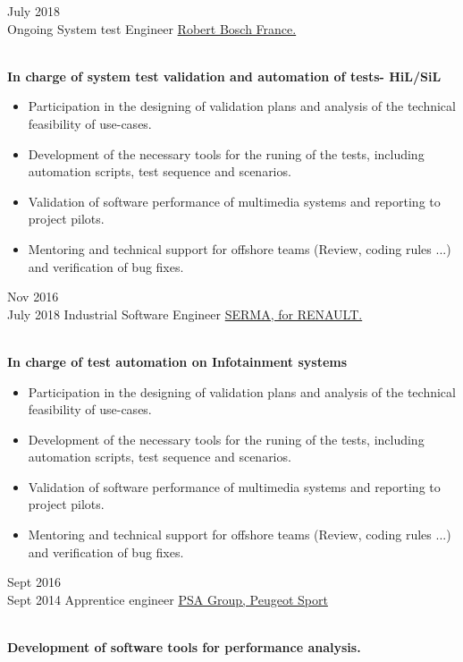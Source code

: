 \documentclass[letterpaper]{twentysecondcv} %
\begin{document}
\begin{twenty} %
	\twentyitem
    	{July 2018 \\Ongoing}
        {System test Engineer}
        {\href{http://www.serma-ingenierie.com/}{Robert Bosch France.}}
        {}
        {
        {\\ \textbf{In charge of system test validation and automation of tests- HiL/SiL}
        \begin{itemize}
        \item Participation in the designing of validation plans and analysis of the technical feasibility of use-cases.
        \item Development of the necessary tools for the runing of the tests, including automation scripts, test sequence and scenarios.
        \item Validation of software performance of multimedia systems and reporting to project pilots.
        \item Mentoring and technical support for offshore teams (Review, coding rules ...) and verification of bug fixes.
       \end{itemize}}
        }
        
	\twentyitem
    	{Nov 2016 \\July 2018}
        {Industrial Software Engineer}
        {\href{http://www.serma-ingenierie.com/}{SERMA, for RENAULT.}}
        {}
        {
        {\\ \textbf{In charge of test automation on Infotainment systems}
        \begin{itemize}
        \item Participation in the designing of validation plans and analysis of the technical feasibility of use-cases.
        \item Development of the necessary tools for the runing of the tests, including automation scripts, test sequence and scenarios.
        \item Validation of software performance of multimedia systems and reporting to project pilots.
        \item Mentoring and technical support for offshore teams (Review, coding rules ...) and verification of bug fixes.
       \end{itemize}}
        }
        
    \twentyitem
   		{Sept 2016  \\Sept 2014 }
        {Apprentice engineer}
        {\href{http://media.peugeot-sport.com/}{PSA Group, Peugeot Sport}}
        {}
        {
        {\\ \textbf{Development of software tools for performance analysis.}
        
}}
\end{twenty}
\end{document}

